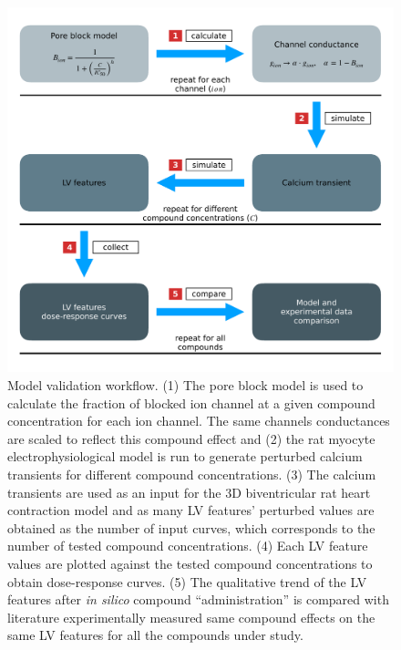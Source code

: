 \begin{figure}[ht!]
    \myfloatalign
    \includegraphics[width=\textwidth]{figures/chapter06/model_validation_schematic.pdf}
    \caption{Model validation workflow. (1) The pore block model is used to calculate the fraction of blocked ion channel at a given compound concentration for each ion channel. The same channels conductances are scaled to reflect this compound effect and (2) the rat myocyte electrophysiological model is run to generate perturbed calcium transients for different compound concentrations. (3) The calcium transients are used as an input for the $3$D biventricular rat heart contraction model and as many LV features' perturbed values are obtained as the number of input curves, which corresponds to the number of tested compound concentrations. (4) Each LV feature values are plotted against the tested compound concentrations to obtain dose-response curves. (5) The qualitative trend of the LV features after \textit{in silico} compound ``administration'' is compared with literature experimentally measured same compound effects on the same LV features for all the compounds under study.}
    \label{fig:validationschematic}
\end{figure}


%
%
%
